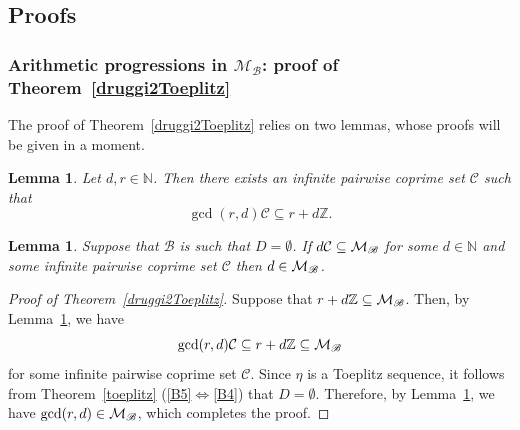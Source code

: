\documentclass[leqno,a4paper,12pt]{article}
\newtheorem{Lemma}[Th]{Lemma}
\theoremstyle{definition}
\newcommand{\cM}{{\cal M}}
\newcommand{\Z}{{\mathbb{Z}}}
\newcommand{\N}{{\mathbb{N}}}
\newcommand{\sB}{\mathscr{B}}
\begin{document}
\subsection{Proofs}\label{dowody}
\subsubsection{Arithmetic progressions in $\mathcal{M}_\sB$: proof of Theorem~\ref{druggi2Toeplitz}}
The proof of Theorem~\ref{druggi2Toeplitz} relies on two lemmas, whose proofs will be given in a moment.
\begin{Lemma}\label{lem1}
Let $d,r\in\N$. Then there exists an infinite pairwise coprime set $\mathcal{C}$ such that
\[
\gcd(r,d)\mathcal{C}\subseteq r+d\Z.
\]
\end{Lemma}
\begin{Lemma}\label{lem2}
Suppose that $\sB$ is such that $D=\emptyset$. If $d\mathcal{C}\subseteq \cM_\sB$ for some $d\in\N$ and some infinite pairwise coprime set $\mathcal{C}$ then $d\in\cM_\sB$.
\end{Lemma}
\begin{proof}[Proof of Theorem~\ref{druggi2Toeplitz}]
Suppose that $r+d\Z \subseteq \cM_\sB$. Then, by Lemma~\ref{lem1}, we have
\[
\gcd(r,d)\mathcal{C} \subseteq r+d\Z\subseteq \cM_\sB
\]
for some infinite pairwise coprime set $\mathcal{C}$. Since $\eta$ is a Toeplitz sequence, it follows from Theorem~\ref{toeplitz} (\eqref{B5}$\Leftrightarrow$\eqref{B4}) that $D=\emptyset$. Therefore, by Lemma~\ref{lem2}, we have $\gcd(r,d) \in \cM_\sB$, which completes the proof.
\end{proof}
\end{document}
